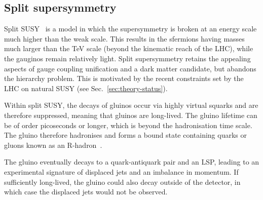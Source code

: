 \subsection{Split supersymmetry}
\label{sec:theory-splitsusy}
Split SUSY~\cite{splitsusy1,splitsusy2} is a model in which the 
supersymmetry is broken at an energy scale much higher than the weak scale. 
This results in the sfermions having masses much larger than the TeV scale 
(beyond the kinematic reach of the LHC), while the gauginos remain relatively 
light. %
Split supersymmetry retains the appealing aspects of gauge coupling unification 
and a dark matter candidate, but abandons the hierarchy problem. This is 
motivated by the recent constraints set by the LHC on natural SUSY (see 
Sec.~\ref{sec:theory-status}).

Within split SUSY, the decays of gluinos occur via highly virtual squarks and 
are therefore suppressed, meaning that gluinos are long-lived. 
The gluino lifetime can be of order picoseconds or longer, which is beyond the 
hadronisation time scale. The gluino therefore hadronises and forms a bound 
state containing quarks or gluons known as an R-hadron~\cite{rhadron}. 

The gluino eventually decays to 
a quark-antiquark pair and an LSP, leading to an experimental signature of 
displaced jets and an imbalance in momentum. If sufficiently long-lived, the 
gluino could also decay outside of the detector, in which case the displaced 
jets would not be observed.




